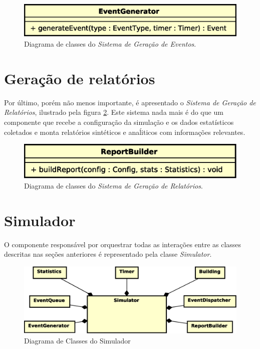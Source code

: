 \begin{figure}[htb!]
  \centering
  \includegraphics[scale=0.6]{img/EventGenerator.eps}
  \caption{Diagrama de classes do \textit{Sistema de Geração de Eventos}.}
\label{fig:diagram:generator}
\end{figure}

\section{\label{sec:model:report}Geração de relatórios}

Por último, porém não menos importante, é apresentado o \textit{Sistema de
Geração de Relatórios}, ilustrado pela figura \ref{fig:diagram:report}. Este
sistema nada mais é do que um componente que recebe a configuração da simulação
e os dados estatísticos coletados e monta relatórios sintéticos e anaĺiticos com
informações relevantes.

\begin{figure}[htb!]
  \centering
  \includegraphics[scale=0.6]{img/Report.eps}
  \caption{Diagrama de classes do \textit{Sistema de Geração de Relatórios}.}
\label{fig:diagram:report}
\end{figure}

\section{Simulador}

O componente responsável por orquestrar todas as interações entre as classes
descritas nas seções anteriores é representado pela classe \textit{Simulator}.

\begin{figure}[htb!]
  \centering
  \includegraphics[scale=0.6]{img/Simulator.eps}
  \caption{Diagrama de Classes do Simulador}
\label{fig:diagram:simulator}
\end{figure}

